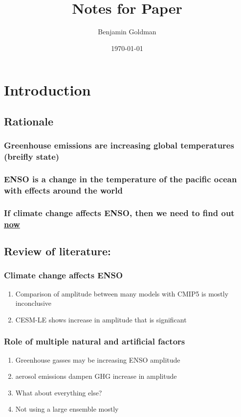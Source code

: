 \documentclass[11pt]{article}
\author{Benjamin Goldman}
\date{\today}
\title{Notes for Paper}
\begin{document}
\maketitle

\section{Introduction}
\label{sec:orge21977b}
\subsection{Rationale}
\label{sec:org22bff9d}
\subsubsection{Greenhouse emissions are increasing global temperatures (breifly state)}
\label{sec:org2d93704}
\subsubsection{ENSO is a change in the temperature of the pacific ocean with effects around the world}
\label{sec:org5775d0e}
\subsubsection{If climate change affects ENSO, then we need to find out \underline{now}}
\label{sec:org56c62ca}
\subsection{Review of literature:}
\label{sec:orge71ba68}
\subsubsection{Climate change affects ENSO}
\label{sec:orgddb4469}
\begin{enumerate}
\item Comparison of amplitude between many models with CMIP5 is mostly inconclusive
\label{sec:org0ff3528}
\item CESM-LE shows increase in amplitude that is significant
\label{sec:org409cf8d}
\end{enumerate}
\subsubsection{Role of multiple natural and artificial factors}
\label{sec:org7c2bb2f}
\begin{enumerate}
\item Greenhouse gasses may be increasing ENSO amplitude
\label{sec:org2ca497c}
\item aerosol emissions dampen GHG increase in amplitude
\label{sec:org21ed145}
\item What about everything else?
\label{sec:org5e6776a}
\item Not using a large ensemble mostly
\label{sec:org4781853}
\end{enumerate}
\end{document}
